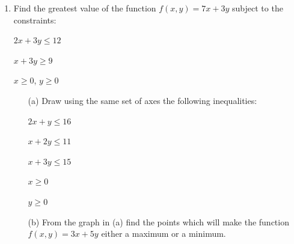 \begin{enumerate}
	\item Find the greatest value of the function $f(x,y) = 7x + 3y$ subject to the constraints:
	
	$2x + 3y\leq 12$
	
	$x + 3y\geq 9$
	
	$x\geq 0$, $y\geq 0$
	
	\begin{itemize}
	\item[(a)] Draw using the same set of axes the following inequalities:

	$2x + y\leq 16$
	
	$x + 2y\leq 11$
	
	$x + 3y\leq 15$
	
	$x\geq 0$
	
	$y\geq 0$
	\item[(b)] From the graph in (a) find the points which will make the function $f(x,y) = 3x + 5y$ either a maximum or a minimum.
	\end{itemize}	 
	
	\end{enumerate}